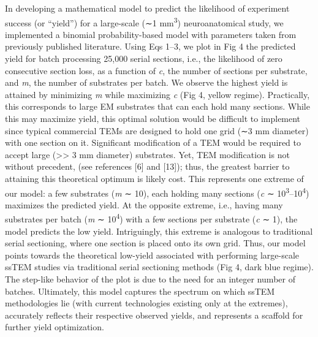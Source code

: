 \documentclass{article}
\begin{document}
In developing a mathematical model to predict the likelihood of experiment success (or “yield”) for a large-scale (∼1 mm\textsuperscript{3}) neuroanatomical study, we implemented a binomial probability-based model with parameters taken from previously published literature. Using Eqs 1–3, we plot in Fig 4 the predicted yield for batch processing 25,000 serial sections, i.e., the likelihood of zero consecutive section loss, as a function of \emph{c}, the number of sections per substrate, and \emph{m}, the number of substrates per batch. We observe the highest yield is attained by minimizing \emph{m} while maximizing \emph{c} (Fig 4, yellow regime). Practically, this corresponds to large EM substrates that can each hold many sections. While this may maximize yield, this optimal solution would be difficult to implement since typical commercial TEMs are designed to hold one grid (∼3 mm diameter) with one section on it. Significant modification of a TEM would be required to accept large (>{}> 3 mm diameter) substrates. Yet, TEM modification is not without precedent, (see references [6] and [13]); thus, the greatest barrier to attaining this theoretical optimum is likely cost. This represents one extreme of our model: a few substrates (\emph{m} ∼ 10), each holding many sections (\emph{c} ∼ 10\textsuperscript{3}–10\textsuperscript{4}) maximizes the predicted yield. At the opposite extreme, i.e., having many substrates per batch (\emph{m} ∼ 10\textsuperscript{4}) with a few sections per substrate (\emph{c} ∼ 1), the model predicts the low yield. Intriguingly, this extreme is analogous to traditional serial sectioning, where one section is placed onto its own grid. Thus, our model points towards the theoretical low-yield associated with performing large-scale ssTEM studies via traditional serial sectioning methods (Fig 4, dark blue regime). The step-like behavior of the plot is due to the need for an integer number of batches. Ultimately, this model captures the spectrum on which ssTEM methodologies lie (with current technologies existing only at the extremes), accurately reflects their respective observed yields, and represents a scaffold for further yield optimization.
\end{document}
